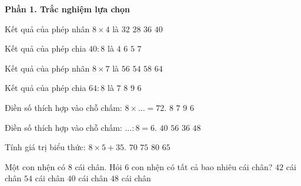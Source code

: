 \textbf{Phần 1. Trắc nghiệm lựa chọn}

\begin{ex} %
Kết quả của phép nhân $8 \times 4$ là
\choice
{\True $32$}
{$28$}
{$36$}
{$40$}
\end{ex}

\begin{ex} %
Kết quả của phép chia $40 : 8$ là
\choice
{$4$}
{$6$}
{\True $5$}
{$7$}
\end{ex}

\begin{ex} %
Kết quả của phép nhân $8 \times 7$ là
\choice
{\True $56$}
{$54$}
{$58$}
{$64$}
\end{ex}

\begin{ex} %
Kết quả của phép chia $64 : 8$ là
\choice
{$7$}
{\True $8$}
{$9$}
{$6$}
\end{ex}

\begin{ex} %
Điền số thích hợp vào chỗ chấm: $8 \times \dots = 72$.
\choice
{$8$}
{$7$}
{\True $9$}
{$6$}
\end{ex}

\begin{ex} %
Điền số thích hợp vào chỗ chấm: $\dots : 8 = 6$.
\choice
{$40$}
{$56$}
{$36$}
{\True $48$}
\end{ex}

\begin{ex} %
Tính giá trị biểu thức: $8 \times 5 + 35$.
\choice
{$70$}
{\True $75$}
{$80$}
{$65$}
\end{ex}

\begin{ex} %
Một con nhện có 8 cái chân. Hỏi 6 con nhện có tất cả bao nhiêu cái chân?
\choice
{$42$ cái chân}
{$54$ cái chân}
{$40$ cái chân}
{\True $48$ cái chân}
\end{ex}

